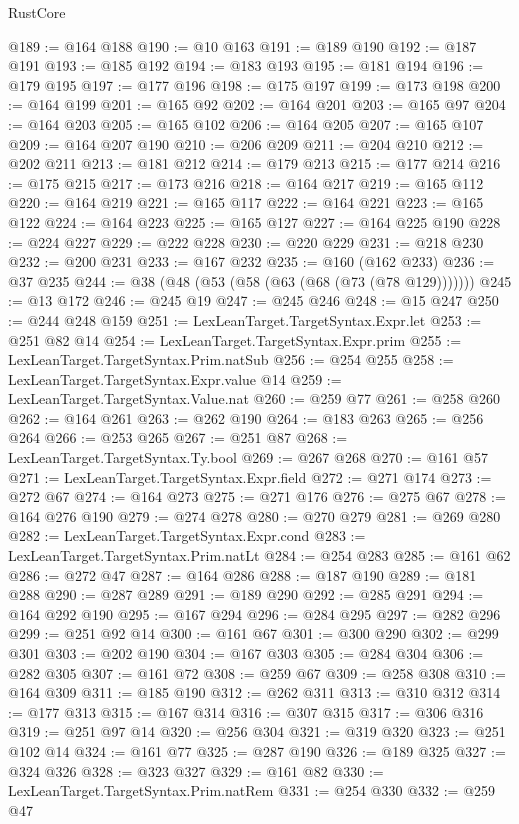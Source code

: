 \begin{lexlean}{RustCore}
\begin{coremodule}
@189 := @164 @188
@190 := @10 @163
@191 := @189 @190
@192 := @187 @191
@193 := @185 @192
@194 := @183 @193
@195 := @181 @194
@196 := @179 @195
@197 := @177 @196
@198 := @175 @197
@199 := @173 @198
@200 := @164 @199
@201 := @165 @92
@202 := @164 @201
@203 := @165 @97
@204 := @164 @203
@205 := @165 @102
@206 := @164 @205
@207 := @165 @107
@209 := @164 @207 @190
@210 := @206 @209
@211 := @204 @210
@212 := @202 @211
@213 := @181 @212
@214 := @179 @213
@215 := @177 @214
@216 := @175 @215
@217 := @173 @216
@218 := @164 @217
@219 := @165 @112
@220 := @164 @219
@221 := @165 @117
@222 := @164 @221
@223 := @165 @122
@224 := @164 @223
@225 := @165 @127
@227 := @164 @225 @190
@228 := @224 @227
@229 := @222 @228
@230 := @220 @229
@231 := @218 @230
@232 := @200 @231
@233 := @167 @232
@235 := @160 (@162 @233)
@236 := @37 @235
@244 := @38 (@48 (@53 (@58 (@63 (@68 (@73 (@78 @129)))))))
@245 := @13 @172
@246 := @245 @19
@247 := @245 @246
@248 := @15 @247
@250 := @244 @248 @159
@251 := LexLeanTarget.TargetSyntax.Expr.let
@253 := @251 @82 @14
@254 := LexLeanTarget.TargetSyntax.Expr.prim
@255 := LexLeanTarget.TargetSyntax.Prim.natSub
@256 := @254 @255
@258 := LexLeanTarget.TargetSyntax.Expr.value @14
@259 := LexLeanTarget.TargetSyntax.Value.nat
@260 := @259 @77
@261 := @258 @260
@262 := @164 @261
@263 := @262 @190
@264 := @183 @263
@265 := @256 @264
@266 := @253 @265
@267 := @251 @87
@268 := LexLeanTarget.TargetSyntax.Ty.bool
@269 := @267 @268
@270 := @161 @57
@271 := LexLeanTarget.TargetSyntax.Expr.field
@272 := @271 @174
@273 := @272 @67
@274 := @164 @273
@275 := @271 @176
@276 := @275 @67
@278 := @164 @276 @190
@279 := @274 @278
@280 := @270 @279
@281 := @269 @280
@282 := LexLeanTarget.TargetSyntax.Expr.cond
@283 := LexLeanTarget.TargetSyntax.Prim.natLt
@284 := @254 @283
@285 := @161 @62
@286 := @272 @47
@287 := @164 @286
@288 := @187 @190
@289 := @181 @288
@290 := @287 @289
@291 := @189 @290
@292 := @285 @291
@294 := @164 @292 @190
@295 := @167 @294
@296 := @284 @295
@297 := @282 @296
@299 := @251 @92 @14
@300 := @161 @67
@301 := @300 @290
@302 := @299 @301
@303 := @202 @190
@304 := @167 @303
@305 := @284 @304
@306 := @282 @305
@307 := @161 @72
@308 := @259 @67
@309 := @258 @308
@310 := @164 @309
@311 := @185 @190
@312 := @262 @311
@313 := @310 @312
@314 := @177 @313
@315 := @167 @314
@316 := @307 @315
@317 := @306 @316
@319 := @251 @97 @14
@320 := @256 @304
@321 := @319 @320
@323 := @251 @102 @14
@324 := @161 @77
@325 := @287 @190
@326 := @189 @325
@327 := @324 @326
@328 := @323 @327
@329 := @161 @82
@330 := LexLeanTarget.TargetSyntax.Prim.natRem
@331 := @254 @330
@332 := @259 @47

\end{coremodule}
\end{lexlean}
